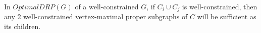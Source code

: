 





\begin{theorem}\label{wc-t1}

In $OptimalDRP(G)$ of a well-constrained $G$, if $C_i \cup C_j$ is well-constrained, then any 2 well-constrained vertex-maximal proper subgraphs of $C$ will be sufficient as its children.
\end{theorem}

